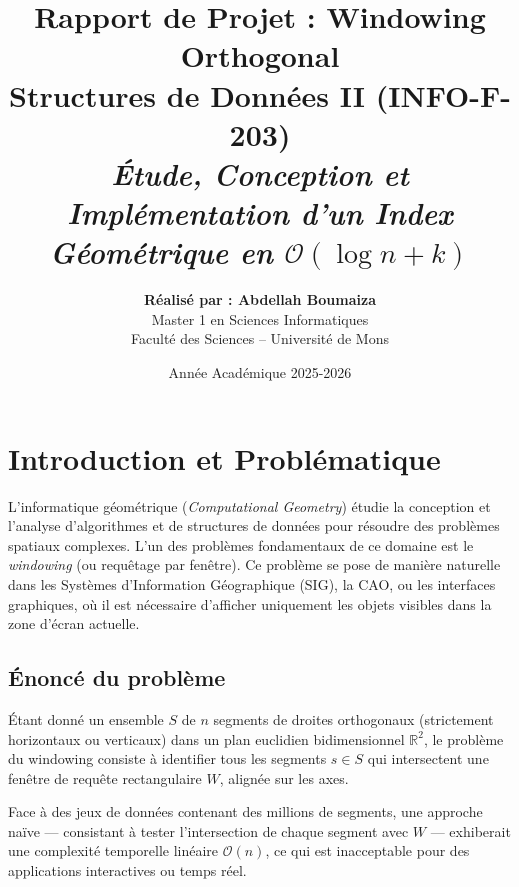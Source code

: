 \documentclass[11pt,a4paper]{article}
\title{
    \vfill
    \textbf{\huge Rapport de Projet : Windowing Orthogonal}\\
    \vspace{0.8cm}
    \large \textbf{Structures de Données II (INFO-F-203)}\\
    \vspace{0.4cm}
    \textit{Étude, Conception et Implémentation d'un Index Géométrique en $\mathcal{O}(\log n + k)$}
    \vfill
}
\author{
    \textbf{Réalisé par : Abdellah Boumaiza} \\
    Master 1 en Sciences Informatiques \\
    Faculté des Sciences -- Université de Mons
}
\date{Année Académique 2025-2026}
\begin{document}
\maketitle
\thispagestyle{empty}
\newpage

\tableofcontents
\newpage

\section{Introduction et Problématique}

L'informatique géométrique (\textit{Computational Geometry}) étudie la conception et l'analyse d'algorithmes et de structures de données pour résoudre des problèmes spatiaux complexes. L'un des problèmes fondamentaux de ce domaine est le \textit{windowing} (ou requêtage par fenêtre). Ce problème se pose de manière naturelle dans les Systèmes d'Information Géographique (SIG), la CAO, ou les interfaces graphiques, où il est nécessaire d'afficher uniquement les objets visibles dans la zone d'écran actuelle.

\subsection{Énoncé du problème}

Étant donné un ensemble $S$ de $n$ segments de droites orthogonaux (strictement horizontaux ou verticaux) dans un plan euclidien bidimensionnel $\mathbb{R}^2$, le problème du windowing consiste à identifier tous les segments $s \in S$ qui intersectent une fenêtre de requête rectangulaire $W$, alignée sur les axes.

Face à des jeux de données contenant des millions de segments, une approche naïve — consistant à tester l'intersection de chaque segment avec $W$ — exhiberait une complexité temporelle linéaire $\mathcal{O}(n)$, ce qui est inacceptable pour des applications interactives ou temps réel.
\end{document}
